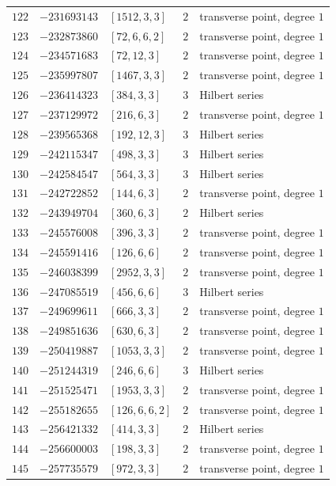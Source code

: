 \documentclass[11pt]{article}
\begin{document}
\begin{center}
\begin{longtable}{r r l c l}
$122$ & $-231693143$ & $[1512,3,3]$ & $2$ & transverse point, degree $1$\\
$123$ & $-232873860$ & $[72,6,6,2]$ & $2$ & transverse point, degree $1$\\
$124$ & $-234571683$ & $[72,12,3]$ & $2$ & transverse point, degree $1$\\
$125$ & $-235997807$ & $[1467,3,3]$ & $2$ & transverse point, degree $1$\\
$126$ & $-236414323$ & $[384,3,3]$ & $3$ & Hilbert series\\
$127$ & $-237129972$ & $[216,6,3]$ & $2$ & transverse point, degree $1$\\
$128$ & $-239565368$ & $[192,12,3]$ & $3$ & Hilbert series\\
$129$ & $-242115347$ & $[498,3,3]$ & $3$ & Hilbert series\\
$130$ & $-242584547$ & $[564,3,3]$ & $3$ & Hilbert series\\
$131$ & $-242722852$ & $[144,6,3]$ & $2$ & transverse point, degree $1$\\
$132$ & $-243949704$ & $[360,6,3]$ & $2$ & Hilbert series\\
$133$ & $-245576008$ & $[396,3,3]$ & $2$ & transverse point, degree $1$\\
$134$ & $-245591416$ & $[126,6,6]$ & $2$ & transverse point, degree $1$\\
$135$ & $-246038399$ & $[2952,3,3]$ & $2$ & transverse point, degree $1$\\
$136$ & $-247085519$ & $[456,6,6]$ & $3$ & Hilbert series\\
$137$ & $-249699611$ & $[666,3,3]$ & $2$ & transverse point, degree $1$\\
$138$ & $-249851636$ & $[630,6,3]$ & $2$ & transverse point, degree $1$\\
$139$ & $-250419887$ & $[1053,3,3]$ & $2$ & transverse point, degree $1$\\
$140$ & $-251244319$ & $[246,6,6]$ & $3$ & Hilbert series\\
$141$ & $-251525471$ & $[1953,3,3]$ & $2$ & transverse point, degree $1$\\
$142$ & $-255182655$ & $[126,6,6,2]$ & $2$ & transverse point, degree $1$\\
$143$ & $-256421332$ & $[414,3,3]$ & $2$ & Hilbert series\\
$144$ & $-256600003$ & $[198,3,3]$ & $2$ & transverse point, degree $1$\\
$145$ & $-257735579$ & $[972,3,3]$ & $2$ & transverse point, degree $1$\\

\end{longtable}
\end{center}
\end{document}
